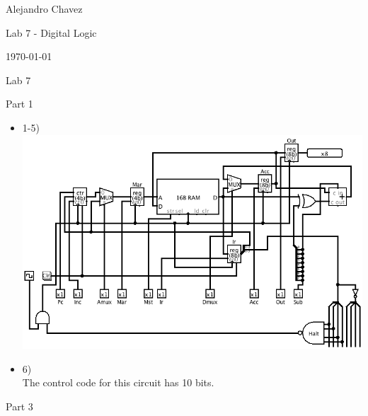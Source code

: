 \documentclass{article}
\begin{document}
\hfill Alejandro Chavez

\hfill Lab 7 - Digital Logic

\hfill \today\\

\begin{center}\begin{large}Lab 7\end{large}\end{center}
Part 1
\begin{itemize}
	\item
		1-5)\\
    \includegraphics[scale=0.5]{lab7-1.png}
  \item
    6)\\
    The control code for this circuit has 10 bits.
\end{itemize}
Part 3
\end{document}
